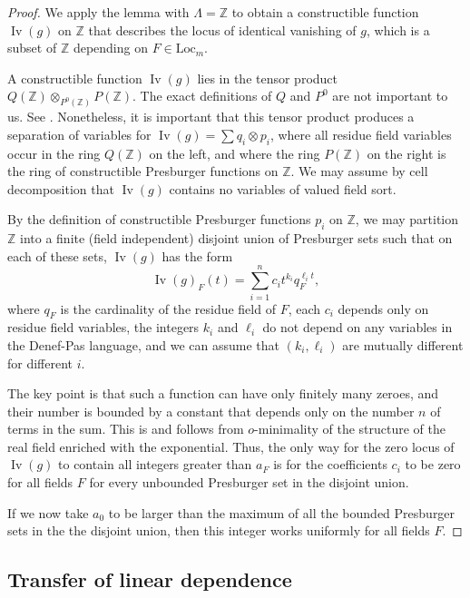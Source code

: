 \documentclass[12pt]{amsart}
\newcommand{\op}[1]{\operatorname{#1}}
\newcommand{\ring}[1]{{\mathbb #1}}
\newcommand{\locus}[1]{\op{Iv}(#1)}
\newcommand{\Loc}{\mathrm{Loc}}
\theoremstyle{plain}
\theoremstyle{definition}
\begin{document}
\begin{proof}
  We apply the lemma with $\Lambda=\ring{Z}$ to obtain a constructible
  function $\locus{g}$ on $\ring{Z}$ that describes the locus of
  identical vanishing of $g$, which is a subset of $\ring{Z}$
  depending on $F\in\Loc_m$.

  A constructible function $\locus{g}$ lies in the tensor product
  $Q(\ring{Z})\otimes_{P^0(\ring{Z})} P(\ring{Z})$.  The exact
  definitions of $Q$ and $P^0$ are not important to us.  See
  \cite{CGH1}.  Nonetheless, it is important that this tensor product
  produces a separation of variables for $\locus{g} = \sum q_i
  \otimes p_i$, where all residue field variables occur in the ring
  $Q(\ring{Z})$ on the left, and where the ring $P(\ring{Z})$ on the
  right is the ring of constructible Presburger functions on
  $\ring{Z}$.  We may assume by cell decomposition that
  $\locus{g}$ contains no variables of valued field sort.

By the definition of constructible Presburger functions $p_i$ on
$\ring{Z}$, we may partition $\ring{Z}$ into a finite (field
independent) disjoint union of Presburger sets such that on each of
these sets, $\locus{g}$ has the form
\[
\locus{g}_F(t) = \sum_{i=1}^n c_i t^{k_i} q_F^{\ell_i t},
\]
where $q_F$ is the cardinality of the residue field of $F$,  each
$c_i$ depends only on residue field variables, the integers $k_i$ and
$\ell_i$ do not depend on any variables in the Denef-Pas language, and
we can assume that $(k_i,\ell_i)$ are mutually different for different
$i$.

The key point is that such a function can have only finitely many
zeroes, and their number is bounded by a constant that depends only on
the number $n$ of terms in the sum.  This is \cite[Lemma
2.1.7]{CGH1} and follows from $o$-minimality of the structure of the
real field enriched with the exponential.  Thus, the only way for the
zero locus of $\locus{g}$ to contain all integers greater than $a_F$
is for the coefficients $c_i$ to be zero for all fields $F$ for every
unbounded Presburger set in the disjoint union.

If we now take $a_0$ to be larger than the maximum of all the bounded
Presburger sets in the the disjoint union, then this integer works
uniformly for all fields $F$.
\end{proof}

\subsection{Transfer of linear dependence}
\end{document}
